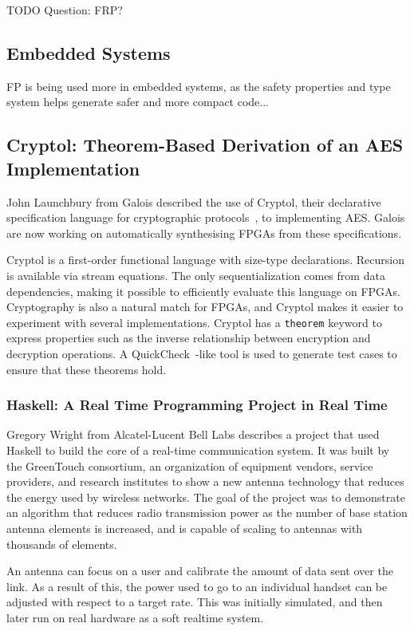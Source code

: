 \documentclass{jfp1}
\begin{document}
TODO Question: FRP?

\subsection{Embedded Systems}

FP is being used more in embedded systems, as the safety properties and type system helps generate safer and more compact code...

\subsection{Cryptol: Theorem-Based Derivation of an AES Implementation}

John Launchbury from Galois described the use of Cryptol, their declarative specification language
for cryptographic protocols~\cite{xxx}, to implementing AES. Galois are now working on automatically
synthesising FPGAs from these specifications.

Cryptol is a first-order functional language with size-type declarations.
Recursion is available via stream equations.  The only sequentialization
comes from data dependencies, making it possible to efficiently evaluate this
language on FPGAs. Cryptography is also a natural match for FPGAs, and Cryptol
makes it easier to experiment with several implementations. Cryptol has a {\tt theorem} 
keyword to express properties such as the inverse relationship between encryption 
and decryption operations. A QuickCheck~\cite{x}-like tool is used to generate test cases
to ensure that these theorems hold.

\subsubsection{Haskell: A Real Time Programming Project in Real Time}

Gregory Wright from Alcatel-Lucent Bell Labs describes a project that used Haskell 
to build the core of a real-time communication system.  It was built by
the GreenTouch consortium, an organization of equipment
vendors, service providers, and research institutes to
show a new antenna technology that reduces the energy used
by wireless networks.  The goal of the project was to demonstrate
an algorithm that reduces radio transmission power as the number
of base station antenna elements is increased, and is capable of scaling
to antennas with thousands of elements.

An antenna can focus on a user and calibrate the amount of data sent over the
link. As a result of this, the power used to go to an individual handset can be
adjusted with respect to a target rate.  This was initially simulated, and then
later run on real hardware as a soft realtime system.
\end{document}
